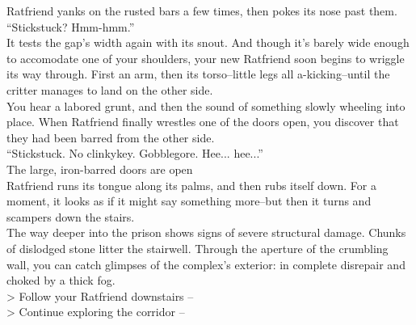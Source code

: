 Ratfriend yanks on the rusted bars a few times, then pokes its nose past them.\\

“Stickstuck? Hmm-hmm.”\\

It tests the gap’s width again with its snout. And though it’s barely wide enough to accomodate one of your shoulders, your new Ratfriend soon begins to wriggle its way through. First an arm, then its torso--little legs all a-kicking--until the critter manages to land on the other side.\\

You hear a labored grunt, and then the sound of something slowly wheeling into place. When Ratfriend finally wrestles one of the doors open, you discover that they had been barred from the other side.\\

“Stickstuck. No clinkykey. Gobblegore. Hee... hee...”\\
 The large, iron-barred doors are open\\

Ratfriend runs its tongue along its palms, and then rubs itself down. For a moment, it looks as if it might say something more--but then it turns and scampers down the stairs.\\

The way deeper into the prison shows signs of severe structural damage. Chunks of dislodged stone litter the stairwell. Through the aperture of the crumbling wall, you can catch glimpses of the complex’s exterior: in complete disrepair and choked by a thick fog.\\

> Follow your Ratfriend downstairs -- \\
> Continue exploring the corridor -- 